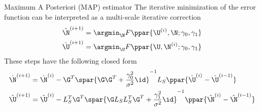  {Maximum A Posteriori (MAP) estimator}
    The iterative minimization of the error function can be interpreted as a multi-scale iterative correction
    \begin{align}
        \hat{\N}^{(i+1)} &= \argmin_{\N} F\ppar{\U^{(i)},\N; \gamma_0, \gamma_1}
        \\
        \hat{\U}^{(i+1)} &= \argmin_{\U} F\ppar{\U,\N^{(i)}; \gamma_0, \gamma_1}
    \end{align}
    These steps have the following closed form
    \begin{align}
        \hat{\N}^{(i+1)} &=
        \hat{\N}^{(i)}
        -
        \G^T \spar{\G \G^T + \frac{\gamma_0^2}{\sigma^2} \id}^{-1} L_S \ppar{\hat{\U}^{(i)}-\hat{\U}^{(i-1)} }
        \\
        \hat{\U}^{(i+1)} &=
        \hat{\U}^{(i)}
        -
        L_S^T \G^T \spar{\G L_S L_S^T \G^T + \frac{\gamma_1^2}{\sigma^2} \id}^{-1} \ppar{\hat{\N}^{(i)}-\hat{\N}^{(i-1)} }
    \end{align}
 


